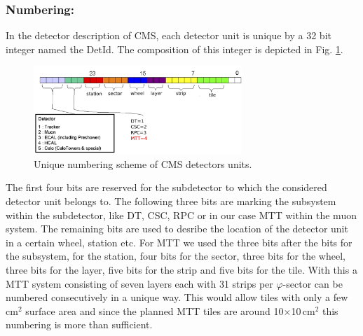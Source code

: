 			\subsubsection*{Numbering:}
			In the detector description of CMS, each detector unit is unique by a 32 bit integer named the DetId.
			The composition of this integer is depicted in Fig. \ref{fig:numbering}.
			\begin{figure}[htbp]
				\centering
				\includegraphics[width=0.70\textwidth]{Figures/erdogan/numbering.png}
				\caption{Unique numbering scheme of CMS detectors units.}
				\label{fig:numbering}
			\end{figure}
			The first four bits are reserved for the subdetector to which the considered detector unit belongs to.
			The following three bits are marking the subsystem within the subdetector, like DT, CSC, RPC or in our case MTT within the muon system.
			The remaining bits are used to desribe the location of the detector unit in a certain wheel, station etc.
			For MTT we used the three bits after the bits for the subsystem, for the station, four bits for the sector, three bits for the wheel, three bits for the layer, five bits for the strip and five bits
			for the tile.
			With this a MTT system consisting of seven layers each with 31 strips per $\varphi$-sector can be numbered consecutively in a unique way.
			This would allow tiles with only a few cm$^2$ surface area and since the planned MTT tiles are around 10$\times$10\,cm$^2$ this numbering is more than sufficient.
